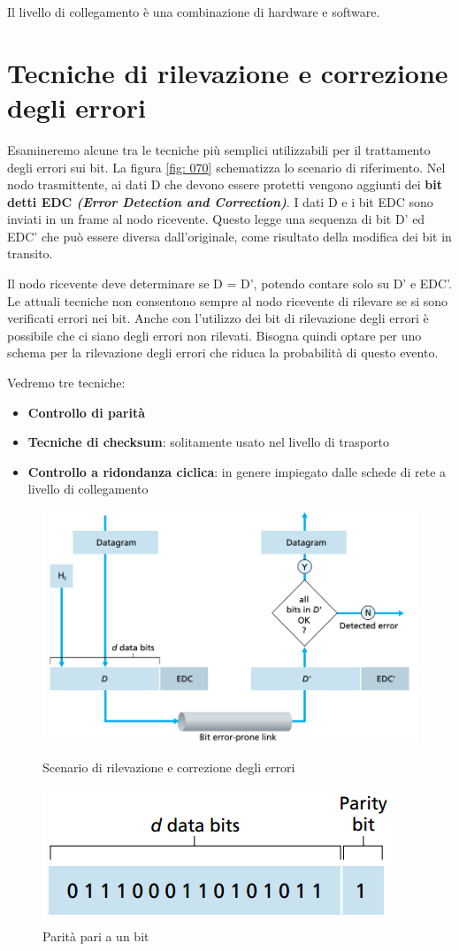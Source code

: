 \documentclass[11pt,a4paper]{book}
\begin{document}
Il livello di collegamento è una combinazione di hardware e software.

\section{Tecniche di rilevazione e correzione degli errori}
Esamineremo alcune tra le tecniche più semplici utilizzabili per il trattamento degli errori sui bit.  La figura \ref{fig: 070} schematizza lo scenario di riferimento. Nel nodo trasmittente, ai dati D che devono essere protetti vengono aggiunti dei \textbf{bit detti EDC \textit{(Error Detection and Correction)}}. I dati D e i bit EDC sono inviati in un frame al nodo ricevente. Questo legge una sequenza di bit D' ed EDC' che può essere diversa dall'originale, come risultato della modifica dei bit in transito.

Il nodo ricevente deve determinare se D = D', potendo contare solo su D' e EDC'. Le attuali tecniche non consentono sempre al nodo ricevente di rilevare se si sono verificati errori nei bit. Anche con l'utilizzo dei bit di rilevazione degli errori è possibile che ci siano degli errori non rilevati. Bisogna quindi optare per uno schema per la rilevazione degli errori che riduca la probabilità di questo evento.

Vedremo tre tecniche:
\begin{itemize}
	\item \textbf{Controllo di parità}
	\item \textbf{Tecniche di checksum}: solitamente usato nel livello di trasporto
	\item \textbf{Controllo a ridondanza ciclica}: in genere impiegato dalle schede di rete a livello di collegamento
\end{itemize}
\begin{figure}
	\includegraphics[scale=0.35]{img/070.png}
	\caption{Scenario di rilevazione e correzione degli errori}
	\label{fig: 070}
	\includegraphics[scale=0.6]{img/071.png}
	\caption{Parità pari a un bit}
	\label{fig: 071}
\end{figure}
\end{document}

